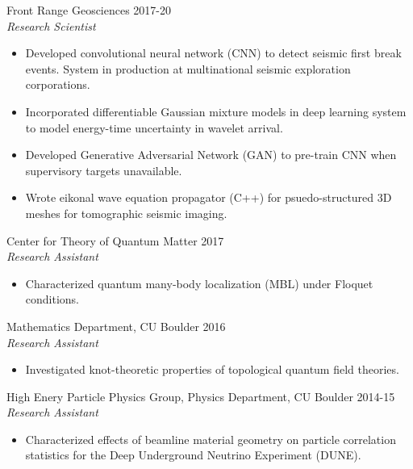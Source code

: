 \documentclass[margin]{res}
\begin{document}
\begin{resume}
 
               Front Range Geosciences \hfill            2017-20 \\
                 {\sl Research Scientist}
                 \begin{itemize}  \itemsep -2pt %
                 \item Developed convolutional neural network (CNN) to detect
                   seismic first break events. System in production at
                   multinational seismic exploration corporations.
                 \item Incorporated differentiable Gaussian mixture models in
                   deep learning system to model energy-time uncertainty in
                   wavelet arrival.
                 \item Developed Generative Adversarial Network (GAN) to pre-train
                   CNN when supervisory targets unavailable.
                 \item Wrote eikonal wave equation propagator (C++) for
                   psuedo-structured 3D meshes for tomographic seismic imaging.
                 \end{itemize} 
                 Center for Theory of Quantum Matter \hfill            2017 \\
		{\sl Research Assistant}
                 \begin{itemize}  \itemsep -2pt %
                 \item Characterized quantum many-body localization (MBL) under Floquet conditions.
                 \end{itemize}

                Mathematics Department, CU Boulder \hfill            2016 \\
		 {\sl Research Assistant}
                 \begin{itemize}  \itemsep -2pt %
                 \item Investigated knot-theoretic properties of topological quantum field theories.
                 \end{itemize}

                High Enery Particle Physics Group, Physics Department, CU Boulder  \hfill            2014-15 \\
		{\sl Research Assistant}
                 \begin{itemize}  \itemsep -2pt %
                 \item Characterized effects of beamline material geometry on particle
                   correlation statistics for the Deep Underground Neutrino Experiment
                   (DUNE).
                 \end{itemize}


\end{resume}
\end{document}

